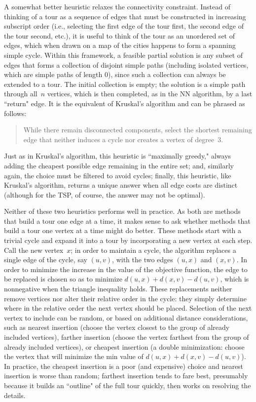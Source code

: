 \documentclass[11pt]{article}
\begin{document}
A somewhat better heuristic relaxes the connectivity constraint.
Instead of thinking of a tour as a sequence of edges that must be constructed
in increasing subscript order (i.e., selecting the first edge of the tour
first, the second edge of the tour second, etc.), it is useful to think of
the tour as an unordered set of edges, which when drawn on a map of the cities
happens to form a spanning simple cycle.  Within this framework, a feasible
partial solution is any subset of edges that forms a collection of disjoint
simple paths (including isolated vertices, which are simple paths of length 0),
since such a collection can always be extended to a tour.
The initial collection is empty; the solution is a simple path through
all~$n$ vertices, which is then completed, as in the NN algorithm, by a last
``return" edge.
It is the equivalent of Kruskal's algorithm and can be phrased as follows:
\begin{quote}
  While there remain disconnected components, select the shortest remaining
  edge that neither induces a cycle nor creates a vertex of degree~$3$.
\end{quote}
Just as in Kruskal's algorithm, this heuristic is ``maximally greedy," always
adding the cheapest possible edge remaining in the entire set; and, similarly
again, the choice must be filtered to avoid cycles; finally, this heuristic,
like Kruskal's algorithm, returns a unique answer when all edge costs are
distinct (although for the TSP, of course, the answer may not be optimal).

Neither of these two heuristics performs well in practice.  As both are methods
that build a tour one edge at a time, it makes sense to ask whether methods that
build a tour one vertex at a time might do better.  These methods start with
a trivial cycle and expand it into a tour by incorporating a new vertex
at each step.  Call the new vertex~$x$; in order to maintain a cycle,
the algorithm replaces a single edge of the cycle, say $(u,v)$, with
the two edges $(u,x)$ and $(x,v)$.  In order to minimize the increase
in the value of the objective function, the edge to be replaced is chosen
so as to minimize $d(u,x)+d(x,v)-d(u,v)$, which is nonnegative when the
triangle inequality holds.  These replacements neither remove vertices
nor alter their relative order in the cycle: they simply determine where
in the relative order the next vertex should be placed.
Selection of the next vertex to include can be random, or based on additional
distance considerations, such as nearest insertion (choose the vertex closest
to the group of already included vertices), farther insertion (choose the vertex
farthest from the group of already included vertices), or cheapest insertion
(a double minimization: choose the vertex that will minimize the min
value of $d(u,x)+d(x,v)-d(u,v)$).   In practice, the cheapest insertion is
a poor (and expensive) choice and nearest insertion is worse than random;
farthest insertion tends to fare best, presumably because it builds an
``outline" of the full tour quickly, then works on resolving the details.
\end{document}

